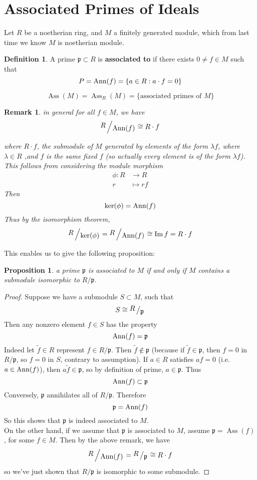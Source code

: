 \documentclass[12pt]{article}
\newcommand{\ann}[1]{\textup{Ann}(#1)}
\DeclareMathOperator{\Ass}{Ass}
\DeclareMathOperator{\Im}{Im}
\newcommand{\bigslant}[2]{{\raisebox{.2em}{$#1$}\left/\raisebox{-.2em}{$#2$}\right.}}
\newcommand{\mapping}[5]{\begin{align*}
#1\colon #2 &\to #3\\
#4 & \mapsto #5
\end{align*}}
\def\p{\mathfrak{p}}
\newtheorem{remark}[theorem]{Remark}
\newtheorem{prop}[theorem]{Proposition}
\theoremstyle{definition}
\newtheorem{definition}[theorem]{Definition}
\begin{document}
\section*{Associated Primes of Ideals}
Let $R$ be a noetherian ring, and $M$ a finitely generated module, which from last time we know $M$ is noetherian module.\\
\begin{definition}
A prime $\p \subset R$ is \textbf{associated to } if there exists $0 \neq f\in M$ such that 
\[
P = \ann{f} = \{a \in R: a\cdot f =0\}
\]
\end{definition}
\begin{notation}
\[
\Ass(M) = \Ass_R(M) = \{\text{associated primes of }M\}
\]
\end{notation}
\begin{remark}
in general for all $f\in M$, we have
\begin{equation}
    \bigslant{R}{\ann{f}} \cong R\cdot f 
\end{equation}

where $R\cdot f$, the submodule of $M$ generated by elements of the form $\lambda f $, where $\lambda \in R$ ,and $f$ is the same fixed $f$ (so actually every element is of the form $\lambda f$). This follows from considering the module morphism
\[
\mapping{\phi}{R}{R}{r}{rf}
\]
Then 
\[
\ker(\phi) = \ann{f}
\]
Thus by the isomorphism theorem,
\[
\bigslant{R}{\ker(\phi)} = \bigslant{R}{\ann{f}} \cong \Im{f} = R\cdot f
\]
\end{remark}
This enables us to give the following proposition:
\begin{prop}
a prime $\p$ is associated to $M$ if and only if $M$ contains a submodule isomorphic to $R/\p$.
\end{prop}
\begin{proof}
Suppose we have a submodule $S \subset M$, such that
\[
S \cong \bigslant{R}{\p}
\]
Then any nonzero element $f\in S$ has the property
\begin{equation}
    \ann{f} = \p
\end{equation}
Indeed let $\tilde{f} \in R$ represent $f\in R/\p$. Then $\tilde{f} \notin \p$ (because if $\tilde{f}\in \p$, then $f = 0$ in $R/ \p$, so $f=0$ in $S$, contrary to assumption). If $a\in R$ satisfies $af = 0$ (i.e. $a\in \ann{f}$), then $a\tilde{f} \in \p$, so by definition of prime, $a\in \p$. Thus 
\[
\ann{f} \subset \p
\]
Conversely, $\p$ annihilates all of $R/\p$. Therefore
\[
\p = \ann{f}
\]
So this shows that $\p$ is indeed associated to $M$.\\
On the other hand, if we assume that $\p$ is associated to $M$, assume $\p = \Ass(f)$, for some $f\in M$. Then by the above remark, we have
\[
\bigslant{R}{\ann{f}} = \bigslant{R}{\p}\cong R \cdot f
\]
so we've just shown that $R/\p$ is isomorphic to some submodule.
\end{proof}
\end{document}
